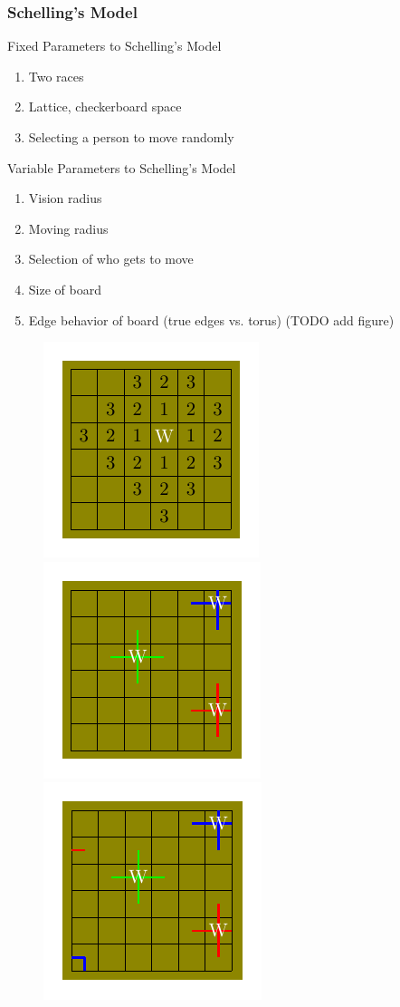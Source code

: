 \documentclass[11pt, handout]{beamer}
\begin{document}
\begin{frame}
    \frametitle{Schelling's Model}
    Fixed Parameters to Schelling's Model
    \begin{enumerate}
        \item Two races
        \item Lattice, checkerboard space
        \item Selecting a person to move randomly
    \end{enumerate}
    Variable Parameters to Schelling's Model
    \begin{enumerate}
        \item Vision radius
        \item Moving radius
        \item Selection of who gets to move
        \item Size of board
        \item Edge behavior of board (true edges vs. torus) (TODO add figure)
    \end{enumerate}
        \begin{figure}
            \center
            \includegraphics[scale=0.7]{cellular_automata_vision/cellular_automata_vision.pdf}
            \includegraphics[scale=0.7]{cellular_automata_trueedges/cellular_automata_trueedges.pdf}
            \includegraphics[scale=0.7]{cellular_automata_torus/cellular_automata_torus.pdf}

\end{figure}
\end{frame}
\end{document}
